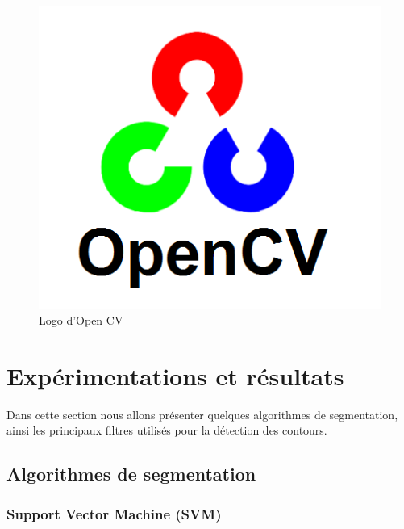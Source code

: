 \documentclass[12pt, openany]{report}
\begin{document}
\begin{figure}[H]
\centering
\includegraphics[scale=0.25]{OpenCV_Logo.png}
\caption{Logo d'Open CV}
\end{figure}










\section{Expérimentations et résultats}

Dans cette section nous allons présenter quelques algorithmes de segmentation, ainsi les principaux filtres utilisés pour la détection des contours.

\subsection{Algorithmes de segmentation}

\subsubsection{Support Vector Machine (SVM)}
\end{document}
